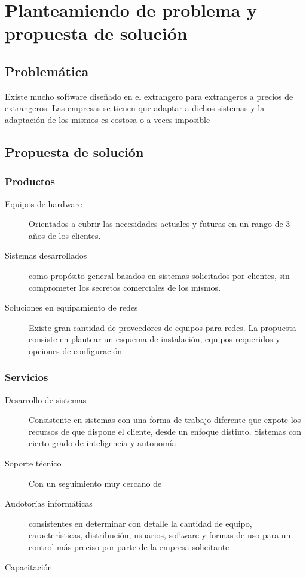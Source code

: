 \documentclass[12pt,spanish,lettersize]{article}
\begin{document}
\section{Planteamiendo de problema y propuesta de soluci\'on}
\subsection{Problem\'atica}
Existe mucho software dise\~nado en el extrangero para extrangeros a precios de extrangeros. Las empresas se tienen que adaptar a dichos sistemas y la adaptaci\'on de los mismos es costosa o a veces imposible
\subsection{Propuesta de soluci\'on}
\subsubsection{Productos}
\begin{description}
\item[Equipos de hardware] Orientados a cubrir las necesidades actuales y futuras en un rango de 3 a\~nos de los clientes.
\item[Sistemas desarrollados] como prop\'osito general basados en sistemas solicitados por clientes, sin comprometer los secretos comerciales de los mismos.
\item[Soluciones en equipamiento de redes] Existe gran cantidad de proveedores de equipos para redes. La propuesta consiste en plantear un esquema de instalaci\'on, equipos requeridos y opciones de configuraci\'on
\end{description}
\subsubsection{Servicios}
\begin{description}
\item[Desarrollo de sistemas] Consistente en sistemas con una forma de trabajo diferente que expote los recursos de que dispone el cliente, desde un enfoque distinto. Sistemas con cierto grado de inteligencia y autonom\'ia
\item[Soporte t\'ecnico] Con un seguimiento muy cercano de
\item[Audotor\'ias inform\'aticas] consistentes en determinar con detalle la cantidad de equipo, caracter\'isticas, distribuci\'on, usuarios, software y formas de uso para un control m\'as preciso por parte de la empresa solicitante
\item[Capacitaci\'on]
\end{description}
\end{document}
